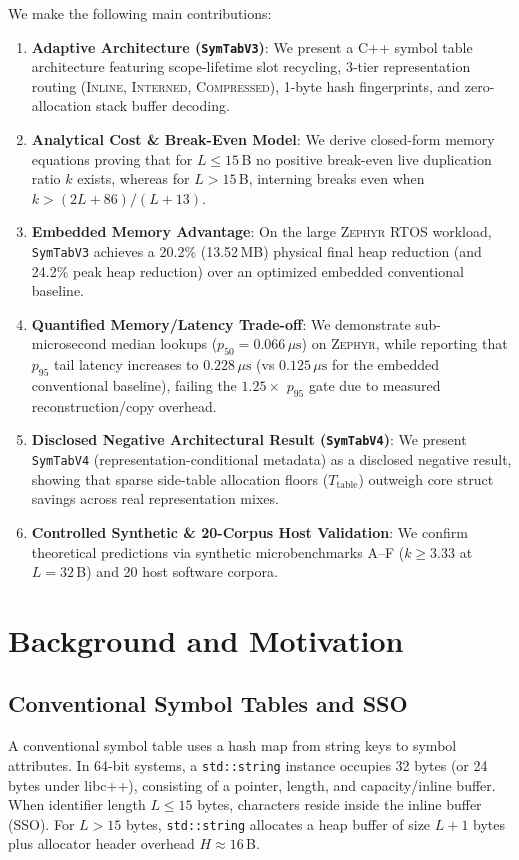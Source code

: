 \documentclass[conference]{IEEEtran}
\begin{document}
We make the following main contributions:
\begin{enumerate}
    \item \textbf{Adaptive Architecture (\texttt{SymTabV3})}: We present a C++ symbol table architecture featuring scope-lifetime slot recycling, 3-tier representation routing (\textsc{Inline}, \textsc{Interned}, \textsc{Compressed}), 1-byte hash fingerprints, and zero-allocation stack buffer decoding.
    \item \textbf{Analytical Cost \& Break-Even Model}: We derive closed-form memory equations proving that for $L \le 15$\,B no positive break-even live duplication ratio $k$ exists, whereas for $L > 15$\,B, interning breaks even when $k > (2L + 86)/(L + 13)$.
    \item \textbf{Embedded Memory Advantage}: On the large \textsc{Zephyr} RTOS workload, \texttt{SymTabV3} achieves a 20.2\% (13.52\,MB) physical final heap reduction (and 24.2\% peak heap reduction) over an optimized embedded conventional baseline.
    \item \textbf{Quantified Memory/Latency Trade-off}: We demonstrate sub-microsecond median lookups ($p_{50} = 0.066\,\mu\text{s}$) on \textsc{Zephyr}, while reporting that $p_{95}$ tail latency increases to $0.228\,\mu\text{s}$ (vs $0.125\,\mu\text{s}$ for the embedded conventional baseline), failing the $1.25\times$ $p_{95}$ gate due to measured reconstruction/copy overhead.
    \item \textbf{Disclosed Negative Architectural Result (\texttt{SymTabV4})}: We present \texttt{SymTabV4} (representation-conditional metadata) as a disclosed negative result, showing that sparse side-table allocation floors ($T_{\text{table}}$) outweigh core struct savings across real representation mixes.
    \item \textbf{Controlled Synthetic \& 20-Corpus Host Validation}: We confirm theoretical predictions via synthetic microbenchmarks A--F ($k \ge 3.33$ at $L=32$\,B) and 20 host software corpora.
\end{enumerate}

\section{Background and Motivation}

\subsection{Conventional Symbol Tables and SSO}
A conventional symbol table uses a hash map from string keys to symbol attributes. In 64-bit systems, a \texttt{std::string} instance occupies 32 bytes (or 24 bytes under libc++), consisting of a pointer, length, and capacity/inline buffer. When identifier length $L \le 15$ bytes, characters reside inside the inline buffer (SSO). For $L > 15$ bytes, \texttt{std::string} allocates a heap buffer of size $L + 1$ bytes plus allocator header overhead $H \approx 16$\,B.
\end{document}
